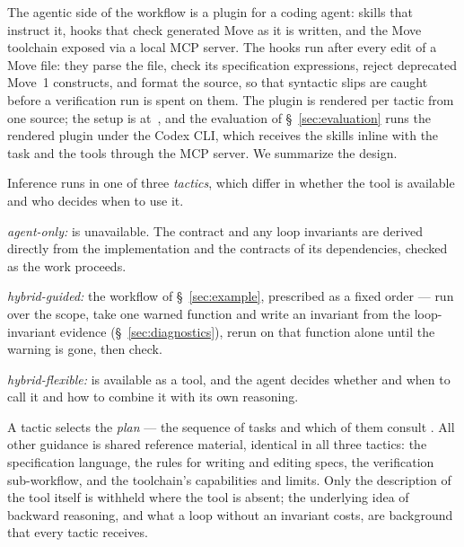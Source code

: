\label{sec:skills}

The agentic side of the workflow is a plugin for a coding agent: skills that instruct it, hooks that check generated Move as it is written, and the Move toolchain exposed via a local MCP server. The hooks run after every edit of a Move file: they parse the file, check its specification expressions, reject deprecated Move~1 constructs, and format the source, so that syntactic slips are caught before a verification run is spent on them. The plugin is rendered per tactic from one source; the setup is at~, and the evaluation of \S~\ref{sec:evaluation} runs the rendered plugin under the Codex CLI, which receives the skills inline with the task and the tools through the MCP server. We summarize the design.

Inference runs in one of three \emph{tactics}, which differ in whether the \WP tool is available and who decides when to use it.
\begin{Itemize}
\item \emph{agent-only:} \WP is unavailable. The contract and any loop invariants are derived directly from the implementation and the contracts of its dependencies, checked as the work proceeds.
\item \emph{hybrid-guided:} the workflow of \S~\ref{sec:example}, prescribed as a fixed order --- run \WP over the scope, take one warned function and write an invariant from the loop-invariant evidence (\S~\ref{sec:diagnostics}), rerun \WP on that function alone until the warning is gone, then check.
\item \emph{hybrid-flexible:} \WP is available as a tool, and the agent decides whether and when to call it and how to combine it with its own reasoning.
\end{Itemize}

A tactic selects the \emph{plan} --- the sequence of tasks and which of them consult \WP. All other guidance is shared reference material, identical in all three tactics: the specification language, the rules for writing and editing specs, the verification sub-workflow, and the toolchain's capabilities and limits. Only the description of the \WP tool itself is withheld where the tool is absent; the underlying idea of backward reasoning, and what a loop without an invariant costs, are background that every tactic receives.

